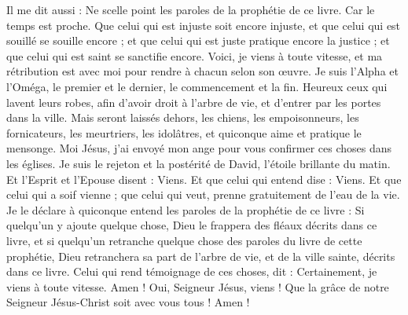 \begin{multicols}{2}
Il me dit aussi : Ne scelle point les paroles de la prophétie de ce livre. Car le temps est proche.
Que celui qui est injuste soit encore injuste, et que celui qui est souillé se souille encore ; et que celui qui est juste pratique encore la justice ; et que celui qui est saint se sanctifie encore.
Voici, je viens à toute vitesse, et ma rétribution est avec moi pour rendre à chacun selon son œuvre.
Je suis l'Alpha et l'Oméga, le premier et le dernier, le commencement et la fin.
Heureux ceux qui lavent leurs robes, afin d'avoir droit à l'arbre de vie, et d'entrer par les portes dans la ville.
Mais seront laissés dehors, les chiens, les empoisonneurs, les fornicateurs, les meurtriers, les idolâtres, et quiconque aime et pratique le mensonge.
Moi Jésus, j'ai envoyé mon ange pour vous confirmer ces choses dans les églises. Je suis le rejeton et la postérité de David, l'étoile brillante du matin.
Et l'Esprit et l'Epouse disent : Viens. Et que celui qui entend dise : Viens. Et que celui qui a soif vienne ; que celui qui veut, prenne gratuitement de l'eau de la vie.
Je le déclare à quiconque entend les paroles de la prophétie de ce livre : Si quelqu'un y ajoute quelque chose, Dieu le frappera des fléaux décrits dans ce livre,
et si quelqu'un retranche quelque chose des paroles du livre de cette prophétie, Dieu retranchera sa part de l'arbre de vie, et de la ville sainte, décrits dans ce livre.
Celui qui rend témoignage de ces choses, dit : Certainement, je viens à toute vitesse. Amen ! Oui, Seigneur Jésus, viens !
Que la grâce de notre Seigneur Jésus-Christ soit avec vous tous ! Amen !
\PPE{}
\end{multicols}
